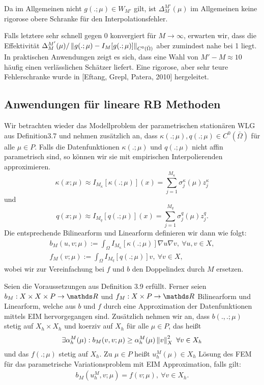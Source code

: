 Da im Allgemeinen nicht $g(.;\mu)\in W_{M'}$ gilt, ist $\Delta_M^{M'}(\mu)$ im Allgemeinen keine rigorose obere Schranke für den Interpolationsfehler.

Falls letztere sehr schnell gegen 0 konvergiert für $M\to \infty$, erwarten wir, dass die Effektivität $\Delta_M^{M'}(\mu)/\left\Vert g(.;\mu) - I_M[g(.;\mu)]\right\Vert_{C^0(\bar{\Omega})}$ aber zumindest nahe bei 1 liegt.
In praktischen Anwendungen zeigt es sich, dass eine Wahl von $M'-M\approx 10$ häufig einen verlässlichen Schätzer liefert.
Eine rigorose, aber sehr teure Fehlerschranke wurde in [Eftang, Grepl, Patera, 2010] hergeleitet.

\subsection{Anwendungen für lineare RB Methoden}
Wir betrachten wieder das Modellproblem der parametrischen stationären WLG aus Definition3.7 und nehmen zusätzlich an, dass $\kappa(.;\mu),q(.;\mu)\in C^0(\bar{\Omega})$ für alle $\mu\in P$.
Falls die Datenfunktionen $\kappa(.;\mu)$ und $q(.;\mu)$ nicht affin parametrisch sind, so können wir sie mit empirischen Interpolierenden approximieren.
\[
\kappa(x;\mu) \approx I_{M_\kappa}[\kappa(.;\mu)](x) = \sum_{j=1}^{M_\kappa} \sigma_j^\kappa(\mu) z_j^\kappa
\]
und
\[
q(x;\mu) \approx I_{M_q}[q(.;\mu)](x) = \sum_{j=1}^{M_q} \sigma_j^q(\mu) z_j^q.
\]
Die entsprechende Bilinearform und Linearform definieren wir dann wie folgt:
\begin{align}
b_M(u,v;\mu) := \int_{\Omega} I_{M_\kappa}[\kappa(.;\mu)] \nabla u \nabla v, ~\forall u,v\in X,\\
f_M(v;\mu) := \int_{\Omega} I_{M_q}[q(.;\mu)] v, ~\forall v\in X,
\end{align}
wobei wir zur Vereinfachung bei $f$ und $b$ den Doppelindex durch $M$ ersetzen.

Seien die Voraussetzungen aus Definition 3.9 erfüllt.
Ferner seien $b_M:X\times X\times P\to \R$ und $f_M:X\times P\to \R$ Bilinearform und Linearform, welche aus $b$ und $f$ durch eine Approximation der Datenfunktionen mittels EIM hervorgegangen sind.
Zusätzlich nehmen wir an, dass $b(.,.;\mu)$ stetig auf $X_h\times X_h$ und koerziv auf $X_h$ für alle $\mu\in P$, das heißt
\[
\exists \alpha_h^M(\mu): b_M(v,v;\mu) \ge \alpha_h^M(\mu) \left\Vert v\right\Vert_X^2 ~\forall v\in X_h
\]
und das $f(.;\mu)$ stetig auf $X_h$.
Zu $\mu\in P$ heißt $u_h^M(\mu)\in X_h$ Lösung des FEM für das parametrische Variationsproblem mit EIM Approximation, falls gilt:
\begin{align}
b_M(u_h^M,v;\mu) = f(v;\mu),~\forall v\in X_h.
\end{align}


